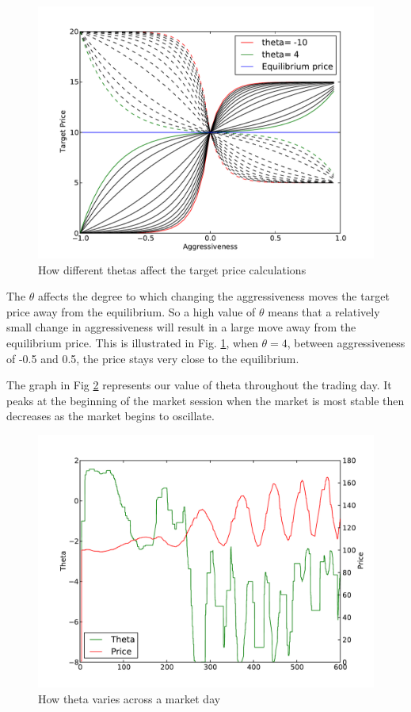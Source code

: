 \documentclass[preprint]{acm_proc_article-sp} %
\begin{document}
\begin{figure}
  \centering
  \label{fig:theta}
  \includegraphics[width=\columnwidth]{graphs_and_stats/graph_thetas.pdf}
  \caption{How different thetas affect the target price calculations}
\end{figure}

The $\theta$ affects the degree to which changing the aggressiveness moves the
target price  away from the equilibrium. So a high value of $\theta$ means that a
relatively small change in aggressiveness will result in a large move away from
the equilibrium price. This is illustrated in Fig. \ref{fig:theta}, when
$\theta=4$, between aggressiveness of -0.5 and 0.5, the price stays very close
to the equilibrium.

The graph in Fig \ref{fig:theta_v_time} represents our value of theta
throughout the trading day. It peaks at the beginning of the market session
when the market is most stable then decreases as the market begins to
oscillate.

\begin{figure}
  \centering
  \label{fig:theta_v_time}
  \includegraphics[width=\columnwidth]{graphs_and_stats/time_v_theta.pdf}
  \caption{How theta varies across a market day}
\end{figure}
\end{document}
